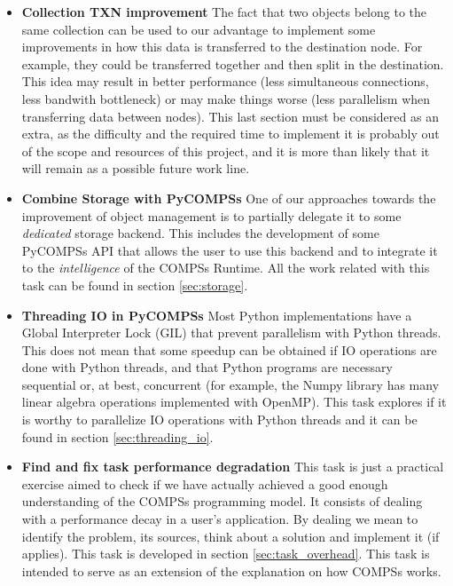 \begin{itemize}
\item \textbf{Collection TXN improvement} The fact that two objects belong to the same collection can be used to our advantage to implement some improvements in how this data is transferred to the destination node. For example, they could be transferred together and then split in the destination. This idea may result in better performance (less simultaneous connections, less bandwith bottleneck) or may make things worse (less parallelism when transferring data between nodes). This last section must be considered as an extra, as the difficulty and the required time to implement it is probably out of the scope and resources of this project, and it is more than likely that it will remain as a possible future work line.

\item \textbf{Combine Storage with PyCOMPSs} One of our approaches towards the improvement of object management is to partially delegate it to some \textit{dedicated} storage backend. This includes the development of some PyCOMPSs API that allows the user to use this backend and to integrate it to the \textit{intelligence} of the COMPSs Runtime. All the work related with this task can be found in section \ref{sec:storage}.

\item \textbf{Threading IO in PyCOMPSs} Most Python implementations have a Global Interpreter Lock (GIL) that prevent parallelism with Python threads. This does not mean that some speedup can be obtained if IO operations are done with Python threads, and that Python programs are necessary sequential or, at best, concurrent (for example, the Numpy library has many linear algebra operations implemented with OpenMP). This task explores if it is worthy to parallelize IO operations with Python threads and it can be found in section \ref{sec:threading_io}.

\item \textbf{Find and fix task performance degradation} This task is just a practical exercise aimed to check if we have actually achieved a good enough understanding of the COMPSs programming model. It consists of dealing with a performance decay in a user's application. By dealing we mean to identify the problem, its sources, think about a solution and implement it (if applies). This task is developed in section \ref{sec:task_overhead}. This task is intended to serve as an extension of the explanation on how COMPSs works.

\end{itemize}

